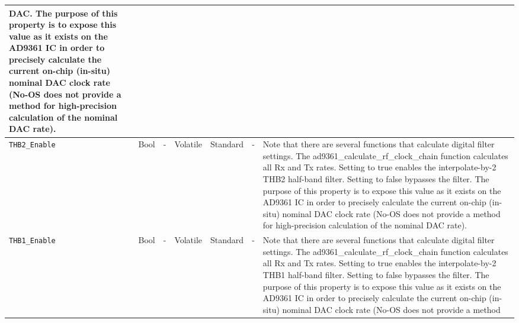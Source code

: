 \documentclass{article}
\begin{document}
\begin{landscape}
\begin{scriptsize}
\begin{longtable}{|p{3.6cm}|p{8.1cm}|p{1.4cm}|p{1.3cm}|p{1.4cm}|p{2.5cm}|p{3.6cm}|}
                                            DAC. The purpose of this property is
                                            to expose this value as it exists on
                                            the AD9361 IC in order to precisely
                                            calculate the current on-chip
                                            (in-situ) nominal DAC clock rate
                                            (No-OS does not provide a method for
                                            high-precision calculation of the
                                            nominal DAC rate). \\
			\hline
			\verb+THB2_Enable+ & Bool & - & Volatile & Standard & - & 
                               Note that there are several
                                 functions that calculate digital filter
                                 settings. The ad9361\_calculate\_rf\_clock\_chain
                                 function calculates all Rx and Tx rates.
                                 Setting to true enables the interpolate-by-2
                                 THB2 half-band filter. Setting to false
                                 bypasses the filter.  The purpose of this
                                 property is to expose this value as it exists
                                 on the AD9361 IC in order to precisely
                                 calculate the current on-chip (in-situ) nominal
                                 DAC clock rate (No-OS does not provide a method
                                 for high-precision calculation of the nominal
                                 DAC rate). \\
			\hline
			\verb+THB1_Enable+ & Bool & - & Volatile & Standard & - & 
                               Note that there are several
                                 functions that calculate digital filter
                                 settings. The ad9361\_calculate\_rf\_clock\_chain
                                 function calculates all Rx and Tx rates.
                                 Setting to true enables the interpolate-by-2
                                 THB1 half-band filter. Setting to false
                                 bypasses the filter.  The purpose of this
                                 property is to expose this value as it exists
                                 on the AD9361 IC in order to precisely
                                 calculate the current on-chip (in-situ) nominal
                                 DAC clock rate (No-OS does not provide a method

\end{longtable}
\end{scriptsize}
\end{landscape}
\end{document}
